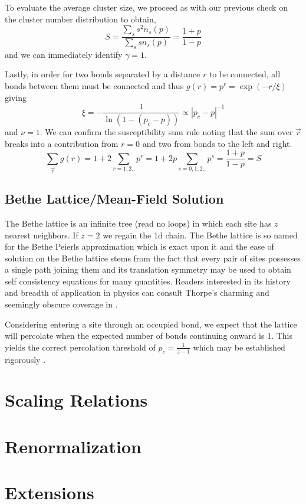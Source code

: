 To evaluate the average cluster size, we proceed as with our previous check on
the cluster number distribution to obtain,
\[S = \frac{\sum_s s^2n_s(p)}{\sum_s sn_s(p)} = \frac{1+p}{1-p}\]
and we can immediately identify $\gamma=1$.

Lastly, in order for two bonds separated by a distance $r$ to be connected, all
bonds between them must be connected and thus \(g(r) = p^r = \exp(-r/\xi)\) giving
\[\xi = -\frac{1}{\ln(1 - (p_c - p))}\propto |p_c - p|^{-1}\]
and $\nu = 1$.  We can confirm the susceptibility sum rule noting that the sum over
$\vec{r}$ breaks into a contribution from $r=0$ and two from bonds to the left and
right.
\[\sum_{\vec{r}}g(r) = 1 + 2\sum_{r=1,2..} p^r = 
1 + 2p\sum_{s=0,1,2..} p^s= \frac{1+p}{1-p} = S\]

\subsection{Bethe Lattice/Mean-Field Solution}

The Bethe lattice is an infinite tree (read no loops) in which each site has
$z$ nearest neighbors.  If $z=2$ we regain the 1d chain. The Bethe lattice is 
so named for the Bethe Peierls
approximation which is exact upon it and the ease of solution on the Bethe lattice stems
from the fact that every pair of sites possesses a single path joining them and its
translation symmetry may be used to obtain self consistency equations for many
quantities. Readers interested in its history and breadth of application in physics
can consult Thorpe's charming and seemingly obscure coverage in \cite{thorpe82}.

Considering entering a site through an occupied bond, we expect that the lattice will
percolate when the expected number of bonds continuing onward is 1.  This yields the
correct percolation threshold of $p_c = \frac{1}{z-1}$ which may be established
rigorously \cite{fisher61}.

\section{Scaling Relations}
\section{Renormalization}
\section{Extensions}

